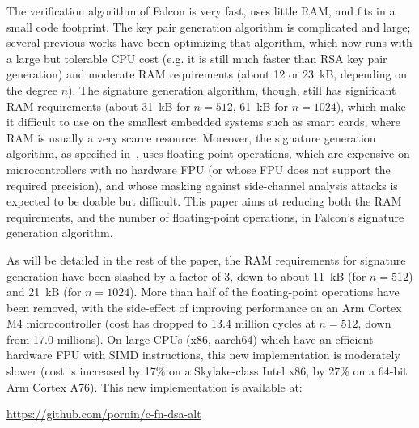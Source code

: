 \documentclass{llncs}
\begin{document}
The verification algorithm of Falcon is very fast, uses little RAM, and
fits in a small code footprint. The key pair generation algorithm is
complicated and large; several previous works have been optimizing that
algorithm\cite{PorPre2019,Por2023-1,Por2025-4}, which now runs with a
large but tolerable CPU cost (e.g. it is still much faster than RSA key
pair generation) and moderate RAM requirements (about 12 or 23~kB,
depending on the degree $n$). The signature generation algorithm,
though, still has significant RAM requirements (about 31~kB for $n =
512$, 61~kB for $n = 1024$), which make it difficult to use on the
smallest embedded systems such as smart cards, where RAM is usually a
very scarce resource. Moreover, the signature generation algorithm, as
specified in~\cite{FalconRound3}, uses floating-point operations, which
are expensive on microcontrollers with no hardware FPU (or whose FPU
does not support the required precision), and whose masking against
side-channel analysis attacks is expected to be doable but
difficult\cite{Ber2026,BerPaiTavBosCol2025,BerTav2025,CheChe2024,CheMinLiuGaoZho2025,KarAys2024}.
This paper aims at reducing both the RAM requirements, and the number of
floating-point operations, in Falcon's signature generation algorithm.

As will be detailed in the rest of the paper, the RAM requirements for
signature generation have been slashed by a factor of 3, down to about
11~kB (for $n = 512$) and 21~kB (for $n = 1024$). More than half of the
floating-point operations have been removed, with the side-effect of
improving performance on an Arm Cortex M4 microcontroller (cost has
dropped to 13.4 million cycles at $n = 512$, down from 17.0 millions).
On large CPUs (x86, aarch64) which have an efficient hardware FPU with
SIMD instructions, this new implementation is moderately slower (cost is
increased by 17\% on a Skylake-class Intel x86, by 27\% on a 64-bit Arm
Cortex A76). This new implementation is available at:
\begin{center}
    \url{https://github.com/pornin/c-fn-dsa-alt}
\end{center}
\end{document}
